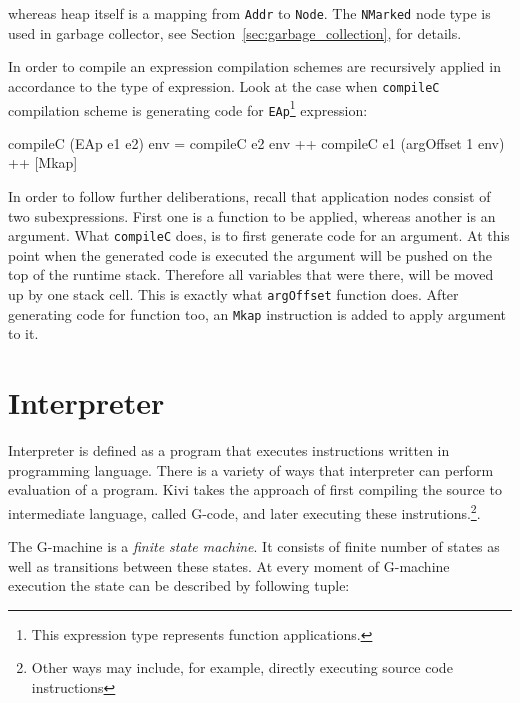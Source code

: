 \documentclass[12pt,a4paper]{report}
\begin{document}
whereas heap itself is a mapping from \texttt{Addr} to \texttt{Node}. The
\texttt{NMarked} node type is used in garbage collector, see
Section~\ref{sec:garbage_collection}, for details.

In order to compile an expression compilation schemes are recursively applied
in accordance to the type of expression. Look at the case when
\texttt{compileC} compilation scheme is generating code for
\texttt{EAp}\footnote{This expression type represents function applications.}
expression:

\vspace*{0.2in}
\begin{code}[style=haskell]
  compileC (EAp e1 e2) env =
      compileC e2 env ++
      compileC e1 (argOffset 1 env) ++
      [Mkap]
\end{code}

In order to follow further deliberations, recall that application nodes consist
of two subexpressions. First one is a function to be applied, whereas another
is an argument. What \texttt{compileC} does, is to first generate code for an
argument. At this point when the generated code is executed the argument will
be pushed on the top of the runtime stack. Therefore all variables that were
there, will be moved up by one stack cell. This is exactly what
\texttt{argOffset} function does. After generating code for function too, an
\texttt{Mkap} instruction is added to apply argument to it.

%
%

\section{Interpreter}
\label{sec:interpreter}
Interpreter is defined as a program that executes instructions written in
programming language. There is a variety of ways that interpreter can perform
evaluation of a program. Kivi takes the approach of first compiling the source
to intermediate language, called G-code, and later executing these
instrutions.\footnote{Other ways may include, for example, directly executing
source code instructions}.

The G-machine is a \textit{finite state machine}. It consists of finite number
of states as well as transitions between these states. At every moment of
G-machine execution the state can be described by following tuple:
\end{document}
